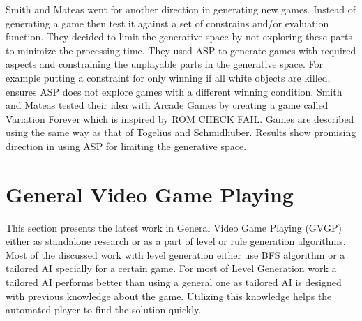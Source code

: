 Smith and Mateas\cite{variationForever} went for another direction in generating new games. Instead of generating a game then test it against a set of constrains and/or evaluation function. They decided to limit the generative space by not exploring these parts to minimize the processing time. They used ASP to generate games with required aspects and constraining the unplayable parts in the generative space. For example putting a constraint for only winning if all white objects are killed, ensures ASP does not explore games with a different winning condition. Smith and Mateas tested their idea with Arcade Games by creating a game called Variation Forever\cite{variationForeverGame} which is inspired by ROM CHECK FAIL\cite{romCheckFail}. Games are described using the same way as that of Togelius and Schmidhuber\cite{arcadeHillClimber}. Results show promising direction in using ASP for limiting the generative space.

\section{General Video Game Playing}
This section presents the latest work in General Video Game Playing (GVGP) either as standalone research or as a part of level or rule generation algorithms. Most of the discussed work with level generation either use BFS algorithm\cite{sokobanLevelGenerationOld} or a tailored AI specially for a certain game\cite{ctrSimulationApproach}. For most of Level Generation work a tailored AI performs better than using a general one as tailored AI is designed with previous knowledge about the game. Utilizing this knowledge helps the automated player to find the solution quickly.\\\par

